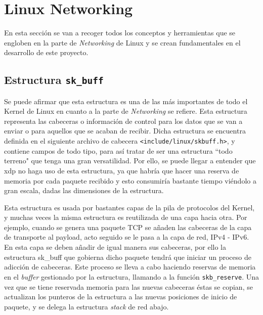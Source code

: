 \section{Linux Networking}
\label{sec:linuxNetworking}

En esta sección se van a recoger todos los conceptos y herramientas que se engloben en la parte de \textit{Networking} de Linux y se crean fundamentales en el desarrollo de este proyecto.  




\subsection{Estructura \texttt{sk\_buff}}
\label{linuxNetworking_skbuff}

Se puede afirmar que  esta estructura es una de las más importantes de todo el Kernel de Linux en cuanto a la parte de \textit{Networking} se refiere. Esta estructura representa las cabeceras o información de control para los datos que se van a enviar o para aquellos que se acaban de recibir. Dicha estructura se encuentra definida en el siguiente archivo de cabecera \texttt{<include/linux/skbuff.h>}, y contiene campos de todo tipo, para así tratar de ser una estructura ``todo terreno" que tenga una gran versatilidad. Por ello, se puede llegar a entender que \gls{xdp} no haga uso de esta estructura, ya que habría que hacer una reserva de memoria por cada paquete recibido y esto consumiría bastante tiempo viéndolo a gran escala, dadas las dimensiones de la estructura.\\
\par

Esta estructura es usada por bastantes capas de la pila de protocolos del Kernel, y muchas veces la misma estructura es reutilizada de una capa hacia otra. Por ejemplo, cuando se genera una paquete TCP se añaden las cabeceras de la capa de transporte al payload,  acto seguido se le pasa a la capa de red, IPv4 - IPv6. En esta capa se deben añadir de igual manera sus cabeceras, por ello la estructura sk\_buff que gobierna dicho paquete tendrá que iniciar un proceso de adicción de cabeceras. Este proceso se lleva a cabo haciendo reservas de memoria en el \textit{buffer} gestionado por la estructura, llamando a la función \texttt{skb\_reserve}. Una vez que se tiene reservada memoria para las nuevas cabeceras éstas se copian, se actualizan los punteros de la estructura a las nuevas posiciones de inicio de paquete, y se delega la estructura \textit{stack} de red abajo.\\
\par

